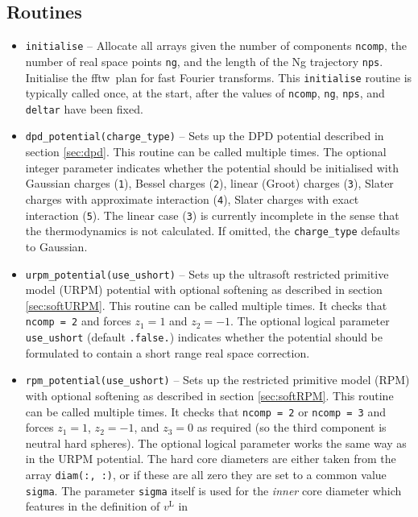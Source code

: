 \documentclass[12pt,a4paper]{article}
\newcommand{\lr}{^{\mathrm{L}}}
\newcommand{\FFTW}{{\sc fftw}}
\begin{document}
\subsection{Routines}
%
\begin{itemize}
%
\item\verb+initialise+ -- Allocate all arrays given the number of
  components \verb+ncomp+, the number of real space points \verb+ng+,
  and the length of the Ng trajectory \verb+nps+.  Initialise the
  \FFTW\ plan for fast Fourier transforms.  This \verb+initialise+
  routine is typically called once, at the start, after the values of
  \verb+ncomp+, \verb+ng+, \verb+nps+, and \verb+deltar+ have been
  fixed.
%
\item\verb+dpd_potential(charge_type)+ -- Sets up the DPD potential
  described in section \ref{sec:dpd}.  This routine can be called
  multiple times.  The optional integer parameter indicates whether
  the potential should be initialised with Gaussian charges
  (\verb+1+), Bessel charges (\verb+2+), linear (Groot) charges
  (\verb+3+), Slater charges with approximate interaction (\verb+4+),
  Slater charges with exact interaction (\verb+5+).  The linear case
  (\verb+3+) is currently incomplete in the sense that the
  thermodynamics is not calculated.  If omitted, the
  \verb+charge_type+ defaults to Gaussian.
%
\item\verb+urpm_potential(use_ushort)+ -- Sets up the ultrasoft
  restricted primitive model (URPM) potential with optional softening
  as described in section \ref{sec:softURPM}.  This routine can be
  called multiple times.  It checks that \verb+ncomp = 2+ and forces
  $z_1=1$ and $z_2=-1$.  The optional logical parameter
  \verb+use_ushort+ (default \verb+.false.+) indicates whether the
  potential should be formulated to contain a short range real space
  correction.
%
\item\verb+rpm_potential(use_ushort)+ -- Sets up the restricted
  primitive model (RPM) with optional softening as described in
  section \ref{sec:softRPM}.  This routine can be called multiple
  times.  It checks that \verb+ncomp = 2+ or \verb+ncomp = 3+ and
  forces $z_1=1$, $z_2=-1$, and $z_3=0$ as required (so the third
  component is neutral hard spheres).  The optional logical parameter
  works the same way as in the URPM potential.  The hard core
  diameters are either taken from the array \verb+diam(:, :)+, or if
  these are all zero they are set to a common value \verb+sigma+.  The
  parameter \verb+sigma+ itself is used for the \emph{inner} core
  diameter which features in the definition of $v\lr$ in

\end{itemize}
\end{document}
